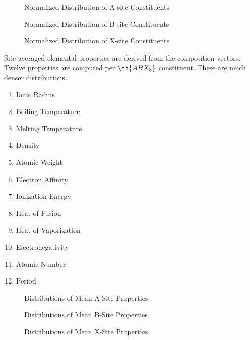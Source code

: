 \documentclass[aip, jmp, amsmath, amssymb, nofootinbib]{revtex4-2}
\begin{document}
\begin{figure}[htbp]
\centering

\caption{Normalized Distribution of A-site Constituents}
\end{figure}

 
\begin{figure}[htbp]
\centering

\caption{Normalized Distribution of B-site Constituents}
\end{figure}

 
\begin{figure}[htbp]
\centering

\caption{Normalized Distribution of X-site Constituents}
\end{figure}

Site-averaged elemental properties are derived from the composition
vectors. Twelve properties are computed per \(\ch{ABX_3}\)
constituent. These are much denser distributions.
\begin{enumerate}
\item Ionic Radius
\item Boiling Temperature
\item Melting Temperature
\item Density
\item Atomic Weight
\item Electron Affinity
\item Ionization Energy
\item Heat of Fusion
\item Heat of Vaporization
\item Electronegativity
\item Atomic Number
\item Period
\end{enumerate}

 
\begin{figure}[htbp]
\centering

\caption{Distributions of Mean A-Site Properties}
\end{figure}

 
\begin{figure}[htbp]
\centering

\caption{Distributions of Mean B-Site Properties}
\end{figure}

 
\begin{figure}[htbp]
\centering

\caption{Distributions of Mean X-Site Properties}
\end{figure}
\end{document}
